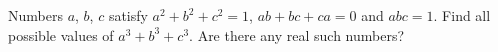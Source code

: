 Numbers $a$, $b$, $c$ satisfy $a^2+b^2+c^2=1$, $ab+bc+ca=0$ and $abc=1$. Find all possible values of $a^3+b^3+c^3$. Are there any real such numbers?
